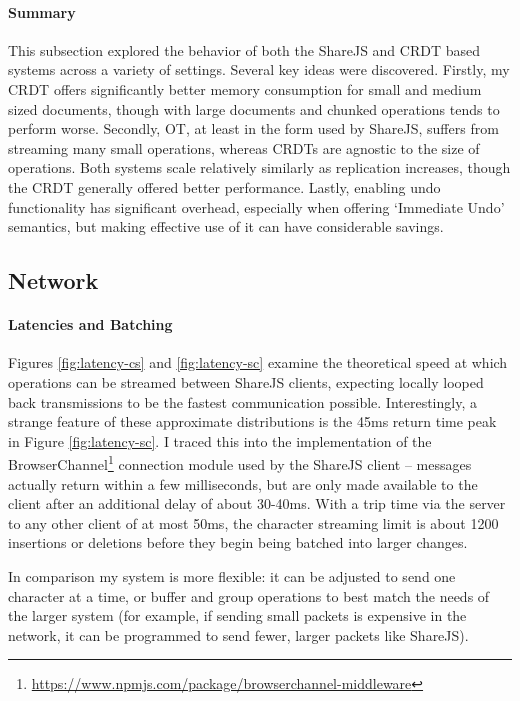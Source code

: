 \documentclass[12pt,a4paper,twoside,openright]{report}
\begin{document}
			\paragraph{Summary}
				This subsection explored the behavior of both the ShareJS and CRDT based systems across a variety of settings. Several key ideas were discovered. Firstly, my CRDT offers significantly better memory consumption for small and medium sized documents, though with large documents and chunked operations tends to perform worse. Secondly, OT, at least in the form used by ShareJS, suffers from streaming many small operations, whereas CRDTs are agnostic to the size of operations. Both systems scale relatively similarly as replication increases, though the CRDT generally offered better performance. Lastly, enabling undo functionality has significant overhead, especially when offering `Immediate Undo' semantics, but making effective use of it can have considerable savings.
					
		\subsection{Network}
			
		
			\paragraph{Latencies and Batching}
			Figures \ref{fig:latency-cs} and \ref{fig:latency-sc} examine the theoretical speed at which operations can be streamed between ShareJS clients, expecting locally looped back transmissions to be the fastest communication possible. Interestingly, a strange feature of these approximate distributions is the 45ms return time peak in Figure \ref{fig:latency-sc}. I traced this into the implementation of the BrowserChannel\footnote{\url{https://www.npmjs.com/package/browserchannel-middleware}} connection module used by the ShareJS client -- messages actually return within a few milliseconds, but are only made available to the client after an additional delay of about 30-40ms. With a trip time via the server to any other client of at most 50ms, the character streaming limit is about 1200 insertions or deletions before they begin being batched into larger changes.
			
			In comparison my system is more flexible: it can be adjusted to send one character at a time, or buffer and group operations to best match the needs of the larger system (for example, if sending small packets is expensive in the network, it can be programmed to send fewer, larger packets like ShareJS).			
			
\end{document}
